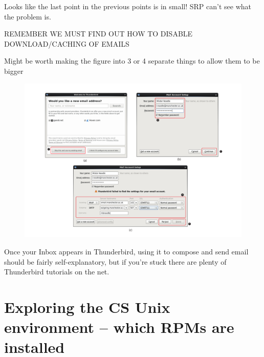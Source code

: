 \begin{note}
Looks like the last point in the previous points is in small! SRP can't see what the problem is.
\end{note}

\begin{note}
REMEMBER WE MUST FIND OUT HOW TO DISABLE DOWNLOAD/CACHING OF EMAILS
\end{note}

\begin{note}
Might be worth making the figure into 3 or 4 separate things to allow them to be bigger
\end{note}

\begin{figure}[h]
\centerline{\includegraphics[width=17cm]{images/thunderbird-instructions}}
\caption{}\label{figure:thunderbird}
\end{figure}

Once your Inbox appears in Thunderbird, using it to compose and send email should be fairly self-explanatory, but if you're stuck there are plenty of Thunderbird tutorials on the net. 


\section{Exploring the CS Unix environment -- which RPMs are installed}



